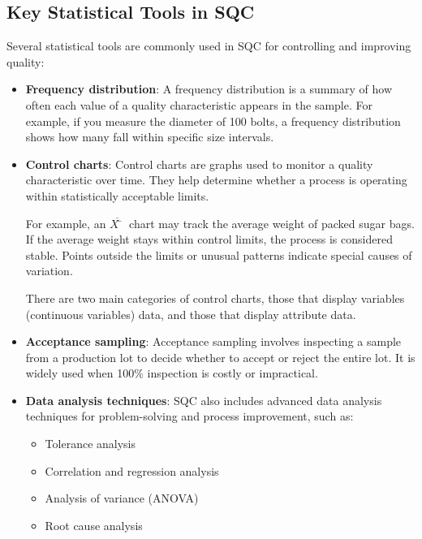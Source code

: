 \documentclass[twoside]{book}
\begin{document}
\subsection{Key Statistical Tools in SQC}

Several statistical tools are commonly used in SQC for controlling and improving quality:

\begin{itemize}

\item \textbf{Frequency distribution}: A frequency distribution is a summary of how often each value of a quality characteristic appears in the sample. For example, if you measure the diameter of 100 bolts, a frequency distribution shows how many fall within specific size intervals.

\item \textbf{Control charts}: Control charts are graphs used to monitor a quality characteristic over time. They help determine whether a process is operating within statistically acceptable limits.

For example, an $ \overline{X̄} $ chart may track the average weight of packed sugar bags. If the average weight stays within control limits, the process is considered stable. Points outside the limits or unusual patterns indicate special causes of variation.

There are two main categories of control charts, those that display variables (continuous variables) data, and those that display attribute data.

\item \textbf{Acceptance sampling}: Acceptance sampling involves inspecting a sample from a production lot to decide whether to accept or reject the entire lot. It is widely used when 100\% inspection is costly or impractical.


\item \textbf{Data analysis techniques}: SQC also includes advanced data analysis techniques for problem-solving and process improvement, such as:
\begin{itemize}
    \item {Tolerance analysis}
    \item {Correlation and regression analysis}
    \item {Analysis of variance (ANOVA)}
    \item {Root cause analysis}
\end{itemize}

\end{itemize}
\end{document}

